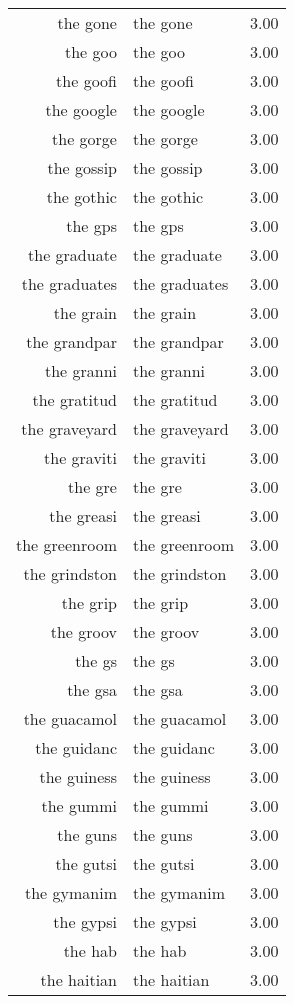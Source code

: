 \begin{table}[ht]
\begin{tabular}{rlr}
  the gone & the gone & 3.00 \\ 
  the goo & the goo & 3.00 \\ 
  the goofi & the goofi & 3.00 \\ 
  the google & the google & 3.00 \\ 
  the gorge & the gorge & 3.00 \\ 
  the gossip & the gossip & 3.00 \\ 
  the gothic & the gothic & 3.00 \\ 
  the gps & the gps & 3.00 \\ 
  the graduate & the graduate & 3.00 \\ 
  the graduates & the graduates & 3.00 \\ 
  the grain & the grain & 3.00 \\ 
  the grandpar & the grandpar & 3.00 \\ 
  the granni & the granni & 3.00 \\ 
  the gratitud & the gratitud & 3.00 \\ 
  the graveyard & the graveyard & 3.00 \\ 
  the graviti & the graviti & 3.00 \\ 
  the gre & the gre & 3.00 \\ 
  the greasi & the greasi & 3.00 \\ 
  the greenroom & the greenroom & 3.00 \\ 
  the grindston & the grindston & 3.00 \\ 
  the grip & the grip & 3.00 \\ 
  the groov & the groov & 3.00 \\ 
  the gs & the gs & 3.00 \\ 
  the gsa & the gsa & 3.00 \\ 
  the guacamol & the guacamol & 3.00 \\ 
  the guidanc & the guidanc & 3.00 \\ 
  the guiness & the guiness & 3.00 \\ 
  the gummi & the gummi & 3.00 \\ 
  the guns & the guns & 3.00 \\ 
  the gutsi & the gutsi & 3.00 \\ 
  the gymanim & the gymanim & 3.00 \\ 
  the gypsi & the gypsi & 3.00 \\ 
  the hab & the hab & 3.00 \\ 
  the haitian & the haitian & 3.00 \\ 

\end{tabular}
\end{table}
